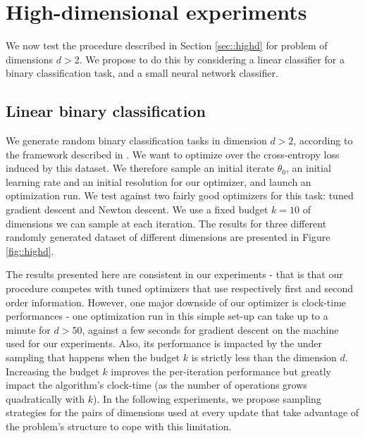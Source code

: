 	\section{High-dimensional experiments}
	{
		We now test the procedure described in Section \ref{sec::highd} for problem of dimensions $d>2$. We propose to do this by considering a linear classifier for a binary classification task, and a small neural network classifier. 
		
		\subsection{Linear binary classification}
		{
			We generate random binary classification tasks in dimension $d>2$, according to the framework described in \cite{guyon2003data}. We want to optimize over the cross-entropy loss induced by this dataset. We therefore sample an initial iterate $\theta_0$, an initial learning rate and an initial resolution for our optimizer, and launch an optimization run. We test against two fairly good optimizers for this task: tuned gradient descent and Newton descent. We use a fixed budget $k=10$ of dimensions we can sample at each iteration. The results for three different randomly generated dataset of different dimensions are presented in Figure \ref{fig::highd}. 
		
			The results presented here are consistent in our experiments - that is that our procedure competes with tuned optimizers that use respectively first and second order information. However, one major downside of our optimizer is clock-time performances - one optimization run in this simple set-up can take up to a minute for $d>50$, against a few seconds for gradient descent on the machine used for our experiments. Also, its performance is impacted by the under sampling that happens when the budget $k$ is strictly less than the dimension $d$. Increasing the budget $k$ improves the per-iteration performance but greatly impact the algorithm's clock-time (as the number of operations grows quadratically with $k$). In the following experiments, we propose sampling strategies for the pairs of dimensions used at every update that take advantage of the problem's structure to cope with this limitation.
		
			
}}
